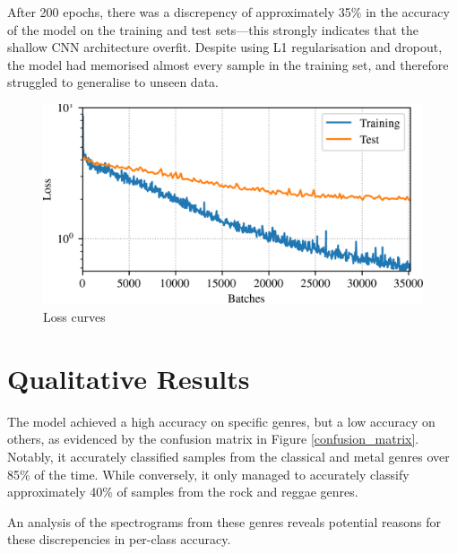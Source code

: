 \documentclass[conference]{IEEEtran}
\begin{document}
After 200 epochs, there was a discrepency of approximately 35\% in the accuracy of the model on the training and test sets---this strongly indicates that the shallow CNN architecture overfit.
Despite using L1 regularisation and dropout, the model had memorised almost every sample in the training set, and therefore struggled to generalise to unseen data.

\begin{figure}[htbp]
    \centerline{\includegraphics[width=\columnwidth]{loss.png}}
    \caption{Loss curves}
    \label{loss_curves}
\end{figure}

\section{Qualitative Results}

The model achieved a high accuracy on specific genres, but a low accuracy on others, as evidenced by the confusion matrix in Figure \ref{confusion_matrix}.
Notably, it accurately classified samples from the classical and metal genres over 85\% of the time.
While conversely, it only managed to accurately classify approximately 40\% of samples from the rock and reggae genres.

An analysis of the spectrograms from these genres reveals potential reasons for these discrepencies in per-class accuracy.
\end{document}

